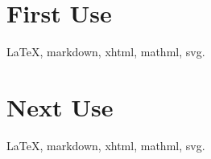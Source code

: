 \documentclass[fontsize=12pt]{scrartcl}
\begin{document}
\section{First Use}

\gls{LaTeX}, \gls{markdown}, \gls{xhtml}, \gls{mathml}, \gls{svg}.

\section{Next Use}

\gls{LaTeX}, \gls{markdown}, \gls{xhtml}, \gls{mathml}, \gls{svg}.

\printunsrtglossary
\end{document}
